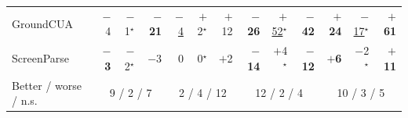 \begin{table}[tp]
\begin{tabular}{@{}lrrrrrrrrrrrr@{}}
GroundCUA & $-$4 & $-$1$^{\star}$ & {\bfseries\boldmath $-$21} & \underline{$-$4} & $+$2$^{\star}$ & $+$12 & {\bfseries\boldmath $-$26} & \underline{$+$52}$^{\star}$ & {\bfseries\boldmath $-$42} & {\bfseries\boldmath $+$24} & \underline{$-$17}$^{\star}$ & {\bfseries\boldmath $+$61} \\
ScreenParse & {\bfseries\boldmath $-$3} & $-$2$^{\star}$ & $-$3 & 0 & 0$^{\star}$ & $+$2 & {\bfseries\boldmath $-$14} & $+$4$^{\star}$ & {\bfseries\boldmath $-$12} & {\bfseries\boldmath $+$6} & $-$2$^{\star}$ & {\bfseries\boldmath $+$11} \\
\midrule
Better / worse / n.s. & \multicolumn{3}{c}{9 / 2 / 7} & \multicolumn{3}{c}{2 / 4 / 12} & \multicolumn{3}{c}{12 / 2 / 4} & \multicolumn{3}{c}{10 / 3 / 5} \\
\bottomrule\end{tabular}\end{table}
